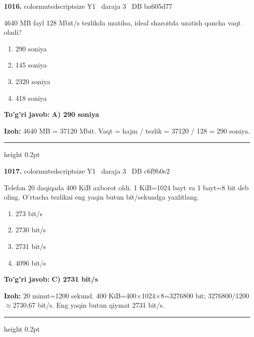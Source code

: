 \documentclass[10pt,a4paper,oneside]{article}
\begin{document}
\noindent\textbf{\color{ink}1016.}  {color{muted}scriptsize Y1 \textbullet\ daraja 3 \textbullet\ DB ba605d77}
\par
4640 MB fayl 128 Mbit/s tezlikda uzatilsa, ideal sharoitda uzatish qancha vaqt oladi?
\begin{enumerate}[label=\Alph*),leftmargin=9mm]
\item 290 soniya
\item 145 soniya
\item 2320 soniya
\item 418 soniya
\end{enumerate}
\begin{tcolorbox}[enhanced,breakable,colback=teal!4,colframe=teal!50!black,boxrule=0.5pt,arc=1.1mm,left=3mm,right=3mm,top=1.7mm,bottom=1.7mm,before skip=2mm,after skip=2mm]
\textbf{\color{teal}To'g'ri javob:} \textbf{A) 290 soniya}
\par\smallskip
\textbf{Izoh:} 4640 MB = 37120 Mbit. Vaqt = hajm / tezlik = 37120 / 128 = 290 soniya.
\end{tcolorbox}
\vspace{2mm}\hrule height 0.2pt \vspace{3mm}

\noindent\textbf{\color{ink}1017.}  {color{muted}scriptsize Y1 \textbullet\ daraja 3 \textbullet\ DB c6f9b0e2}
\par
Telefon 20 daqiqada 400 KiB axborot oldi. 1 KiB=1024 bayt va 1 bayt=8 bit deb oling. O'rtacha tezlikni eng yaqin butun bit/sekundga yaxlitlang.
\begin{enumerate}[label=\Alph*),leftmargin=9mm]
\item 273 bit/s
\item 2730 bit/s
\item 2731 bit/s
\item 4096 bit/s
\end{enumerate}
\begin{tcolorbox}[enhanced,breakable,colback=teal!4,colframe=teal!50!black,boxrule=0.5pt,arc=1.1mm,left=3mm,right=3mm,top=1.7mm,bottom=1.7mm,before skip=2mm,after skip=2mm]
\textbf{\color{teal}To'g'ri javob:} \textbf{C) 2731 bit/s}
\par\smallskip
\textbf{Izoh:} 20 minut=1200 sekund. 400 KiB=400\ensuremath{\times}1024\ensuremath{\times}8=3276800 bit; 3276800/1200\ensuremath{\approx}2730,67 bit/s. Eng yaqin butun qiymat 2731 bit/s.
\end{tcolorbox}
\vspace{2mm}\hrule height 0.2pt \vspace{3mm}
\end{document}
